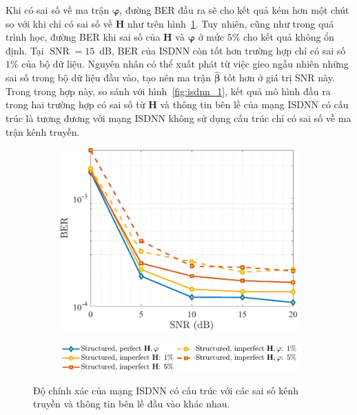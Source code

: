 Khi có sai số về ma trận $\boldsymbol{\varphi}$, đường BER đầu ra sẽ cho kết quả kém hơn một chút so với khi chỉ có sai số về $\mathbf{H}$ như trên hình~\ref{fig:isdnn_3}. Tuy nhiên, cũng như trong quá trình học, đường BER khi sai số của $\mathbf{H}$ và $\boldsymbol{\varphi}$ ở mức $5\%$ cho kết quả không ổn định. Tại $\operatorname{SNR}=15$~dB, BER của ISDNN còn tốt hơn trường hợp chỉ có sai số $1\%$ của bộ dữ liệu. Nguyên nhân có thể xuất phát từ việc gieo ngẫu nhiên những sai số trong bộ dữ liệu đầu vào, tạo nên ma trận $\hat{\boldsymbol{\beta}}$ tốt hơn ở giá trị SNR này. Trong trong hợp này, so sánh với hình~\ref{fig:isdnn_1}, kết quả mô hình đầu ra trong hai trường hợp có sai số từ $\mathbf{H}$ và thông tin bên lề của mạng ISDNN có cấu trúc là tương đương với mạng ISDNN không sử dụng cấu trúc chỉ có sai số về ma trận kênh truyền.
\begin{figure}[H]
    \centering
    \begin{subfigure}{\linewidth}
        \centering
        \includegraphics[width=.6\linewidth]{figures/performance_3.pdf}
    \end{subfigure}
    \hfill
    \begin{subfigure}{\linewidth}
        \centering
        \includegraphics[width=.6\linewidth]{figures/lg_performance_31.pdf}
    \end{subfigure}
    \caption{Độ chính xác của mạng ISDNN có cấu trúc với các sai số kênh truyền và thông tin bên lề đầu vào khác nhau.}
    \label{fig:isdnn_3}
\end{figure}
